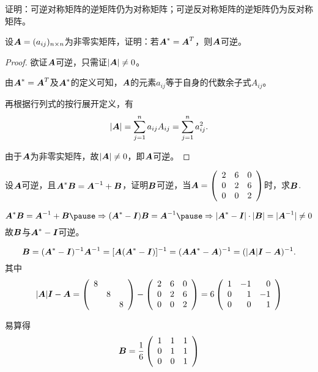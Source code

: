 \begin{frame}
\begin{li}
  证明：可逆对称矩阵的逆矩阵仍为对称矩阵；可逆反对称矩阵的逆矩阵仍为反对称矩阵。
\end{li}
\end{frame}

\begin{frame}
\begin{li}
  设$\boldsymbol{A}=(a_{ij})_{n\times n}$为非零实矩阵，证明：若$\boldsymbol{A}^*=\boldsymbol{A}^T$，则$\boldsymbol{A}$可逆。
\end{li} \pause 
\begin{proof}
欲证$\boldsymbol{A}$可逆，只需证$|\boldsymbol{A}|\ne 0$。 \pause 

由$\boldsymbol{A}^* = \boldsymbol{A}^T$及$\boldsymbol{A}^*$的定义可知，$\boldsymbol{A}$的元素$a_{ij}$等于自身的代数余子式$A_{ij}$。 \pause 

再根据行列式的按行展开定义，有
$$
|\boldsymbol{A}| = \sum_{j=1}^n a_{ij} A_{ij} = \sum_{j=1}^n a_{ij}^2.
$$ \pause 

由于$\boldsymbol{A}$为非零实矩阵，故$|\boldsymbol{A}|\ne 0$，即$\boldsymbol{A}$可逆。
\end{proof}
\end{frame}

\begin{frame}
\begin{li}
  设$\boldsymbol{A}$可逆，且$\boldsymbol{A}^*\boldsymbol{B} = \boldsymbol{A}^{-1}+\boldsymbol{B}$，证明$\boldsymbol{B}$可逆，当$\boldsymbol{A}=\left(
    \begin{array}{ccc}
      2 & 6 & 0 \\
      0 & 2 & 6\\
      0 & 0 & 2
    \end{array}
  \right)$时，求$\boldsymbol{B}$.
\end{li}
\begin{jie}
$$
\MA^*\MB = \MA^{-1}+\MB  \pause \Rightarrow (\MA^*-\MI)\MB = \MA^{-1} \pause 
\Rightarrow |\MA^*-\MI|\cdot |\MB| = |\MA^{-1}|\ne 0 
$$ \pause 
故$\boldsymbol{B}$与$\boldsymbol{A}^*-\boldsymbol{I}$可逆。 \pause 

$$
\boldsymbol{B} = (\boldsymbol{A}^*-\boldsymbol{I})^{-1} \boldsymbol{A}^{-1} = [\boldsymbol{A}(\boldsymbol{A}^*-\boldsymbol{I})]^{-1} = (\boldsymbol{A}\boldsymbol{A}^*-\boldsymbol{A})^{-1} = (|\boldsymbol{A}|\boldsymbol{I}-\boldsymbol{A})^{-1}.
$$
其中
$$
|\boldsymbol{A}|\boldsymbol{I}-\boldsymbol{A} = \left(
  \begin{array}{ccc}
    8 & &\\
      & 8 &\\
      & & 8
  \end{array}
\right) - \left(
  \begin{array}{ccc}
    2 & 6 & 0 \\
    0 & 2 & 6\\
    0 & 0 & 2
  \end{array}
\right) = 6 \left(
  \begin{array}{rrr}
    1 & -1 & 0 \\
    0 &  1 & -1\\
    0 & 0 & 1
  \end{array}
\right)
$$ \pause 

易算得
$$
\boldsymbol{B} = \frac16 \left(
  \begin{array}{rrr}
    1 &  1 & 1 \\
    0 &  1 & 1\\
    0 & 0 & 1
  \end{array}
\right)
$$
\end{jie}
\end{frame}

